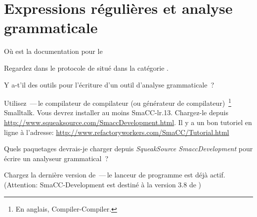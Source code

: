 \documentclass[a4paper,10pt,twoside]{book}
\begin{document}
\section{Expressions régulières et analyse grammaticale}


\begin{faq}
Où est la documentation pour le 
\end{faq}
\answer
Regardez dans le protocole  de  situé dans la catégorie .

\begin{faq}
Y a-t'il des outils pour l'écriture d'un outil d'analyse grammaticale~?
\end{faq}
\answer
Utilisez \,---\,le compilateur de compilateur (ou générateur de compilateur)~\footnote{En anglais, Compiler-Compiler.} Smalltalk.
Vous devrez installer au moins SmaCC-lr.13.
Chargez-le depuis \url{http://www.squeaksource.com/SmaccDevelopment.html}.
Il y a un bon tutoriel en ligne à l'adresse:
\url{http://www.refactoryworkers.com/SmaCC/Tutorial.html} %

\begin{faq}
Quels paquetages devrais-je charger depuis \emph{SqueakSource SmaccDevelopment} pour écrire un analyseur grammatical~?
\end{faq}
\answer
Chargez la dernière version de \,---\,le lanceur de programme est déjà actif.
(Attention: SmaCC-Development est destiné à la version 3.8 de \squeak)
\end{document}
